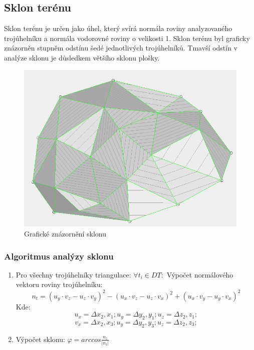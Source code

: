 \documentclass[a4paper, 12pt]{article}
\begin{document}
\newpage

\subsection{Sklon terénu}
Sklon terénu je určen jako úhel, který svírá normála roviny analyzovaného trojúhelníku a normála vodorovné roviny o velikosti 1. Sklon terénu byl graficky znázorněn stupněm odstínu šedé jednotlivých trojúhelníků. Tmavší odstín v analýze sklonu je důsledkem většího sklonu plošky. 

\begin{figure}[h!]
	\centering
	\includegraphics[width=14cm]{sklon.jpg}
	\caption{Grafické znázornění sklonu}
\end{figure}

\subsubsection{Algoritmus analýzy sklonu}
\begin{enumerate}
\item Pro všechny trojúhelníky triangulace: $ \forall t_i \in DT: $
\subitem Výpočet normálového vektoru roviny trojúhelníku: \\
 $$ n_t = (u_y \cdot v_z - u_z \cdot v_y)^2 - (u_x \cdot v_z - u_z \cdot v_x)^2  + (u_x \cdot v_y - u_y \cdot v_x)^2 $$
\subitem Kde:
$$  u_x = \Delta x_2, x_1; u_y = \Delta y_2, y_1; u_z = \Delta z_2, z_1;$$
$$  v_x = \Delta x_2, x_3; u_y = \Delta y_2, y_3; u_z = \Delta z_2, z_3;$$
\item Výpočet sklonu: $ \varphi = arccos \frac{n_z}{|n_t|} $
\end{enumerate}
\newpage
\end{document}

